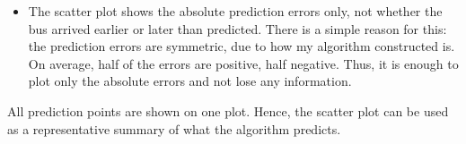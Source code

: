 \documentclass[12pt,a4paper,oneside,openright]{report}
\begin{document}
\begin{itemize}
\begin{itemize}
    For some bus it took $4$ minutes to pass just a few buildings. Since most
    historical trips usually pass this segment in a much shorter
    time\footnote{e.g. 30s}, the predicted arrival time to the bus stop is
    much smaller than the actual arrival time. Therefore, the large error value 
    is generated.

    \item
    The scatter plot shows the absolute prediction errors only, not whether
    the bus arrived earlier or later than predicted. There is a simple reason for
    this: the prediction errors are symmetric, due to how my algorithm constructed
    is. On average, half of the errors are positive, half negative. Thus, it is
    enough to plot only the absolute errors and not lose any information.

\end{itemize}

All prediction points are shown on one plot. Hence, the scatter plot can be
used as a representative summary of what the algorithm predicts.


\end{itemize}
\end{document}
